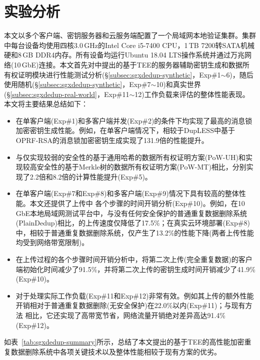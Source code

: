 \section{实验分析}
\label{sec:sgxdedup-evaluation}

本文以多个客户端、密钥服务器和云服务端配置了一个局域网本地验证集群。集群中每台设备均使用四核3.0\,GHz的Intel Core i5-7400 CPU，1\,TB 7200转SATA机械硬和8\,GB DDR4内存。所有设备均运行Ubuntu 18.04 LTS操作系统并通过万兆网络(10\,GbE)连接。本文首先对\sysnameS 中提出的基于TEE的服务器辅助密钥生成和数据所有权证明模块进行性能测试分析(\S\ref{subsec:sgxdedup-synthetic}，Exp\#1$\sim$6)，随后使用随机(\S\ref{subsec:sgxdedup-synthetic}，Exp\#7$\sim$10)和真实世界(\S\ref{subsec:sgxdedup-real-world}，Exp\#11$\sim$12)工作负载来评估\sysnameS 的整体性能表现。本文将主要结果总结如下：

\begin{itemize}[leftmargin=0em]
    \item \sysnameS 在单客户端(Exp\#1)和多客户端并发(Exp\#2)的条件下均实现了最高的消息锁加密密钥生成性能。例如，在单客户端情况下，相较于DupLESS\cite{bellare2013DupLESS}中基于OPRF-RSA的消息锁加密密钥生成实现了131.9倍的性能提升。
    \item \sysnameS 与仅实现较弱的安全性的基于通用哈希的数据所有权证明方案(PoW-UH)\cite{xu2013weak}和实现较高安全性的基于Merkle树的数据所有权证明方案(PoW-MT)\cite{halevi11}相比，分别实现了2.2倍和8.2倍的计算性能提升(Exp\#5)。
    \item \sysnameS 在单客户端(Exp\#7和Exp\#8)和多客户端(Exp\#9)情况下具有较高的整体性能。本文还提供了上传中 \sysnameS 各个步骤的时间开销分析(Exp\#10)。例如，在10\,GbE本地局域网测试平台中，与没有任何安全保护的普通重复数据删除系统(PlainDedup)相比，\sysnameS 的上传速度仅降低了17.5\%；在真实云环境部署(Exp\#8)中，相较于普通重复数据删除系统，\sysnameS 仅产生了13.2\%的性能下降(两者上传性能均受到网络带宽限制)。
    \item 在上传过程的各个步骤时间开销分析中，\sysnameS 将第二次上传(完全重复数据)的客户端初始化时间减少了91.5\%，并将第二次上传的密钥生成时间开销减少了41.9\%(Exp\#10)。
    \item \sysnameS 对于处理实际工作负载(Exp\#11和Exp\#12)非常有效。例如其上传的额外性能开销相对于普通重复数据删除(无安全保护)在22.0\%以内(Exp\#11)；与现有方法\cite{li15,harnik2010side} 相比，它还实现了高带宽节省，网络流量开销绝对差异高达91.4\%(Exp\#12)。
\end{itemize}

如表~\ref{tab:sgxdedup-summary}所示，总结了本文提出的基于TEE的高性能加密重复数据删除系统\sysnameS 中各项关键技术以及整体性能相较于现有方案的优劣。

